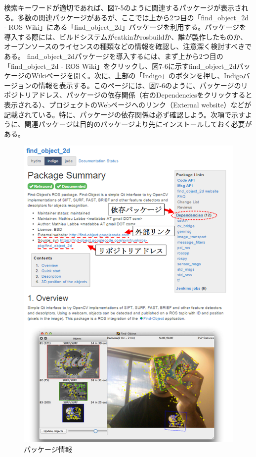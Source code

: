 検索キーワードが適切であれば、図7-5のように関連するパッケージが表示される。多数の関連パッケージがあるが、ここでは上から2つ目の「find\_object\_2d - ROS Wiki」にある「find\_object\_2d」パッケージを利用する。パッケージを導入する際には、ビルドシステムがcatkinかrosbuildか、誰が製作したものか、オープンソースのライセンスの種類などの情報を確認し、注意深く検討すべきである。
find\_object\_2dパッケージを導入するには、まず上から2つ目の「find\_object\_2d - ROS Wiki」をクリックし、図7-6に示すfind\_object\_2dパッケージのWikiページを開く。次に、上部の「Indigo」のボタンを押し、Indigoバージョンの情報を表示する。このページには、図7-6のように、パッケージのリポジトリアドレス、パッケージの依存関係（右のDependenciesをクリックすると表示される）、プロジェクトのWebページへのリンク（External website）などが記載されている。特に、パッケージの依存関係は必ず確認しよう。次項で示すように、関連パッケージは目的のパッケージより先にインストールしておく必要がある。

\begin{figure}[htp]
  \centering
  \includegraphics[width=\columnwidth]{pictures/chapter7/pic_07_06.png}
  \caption{パッケージ情報}
\end{figure}


